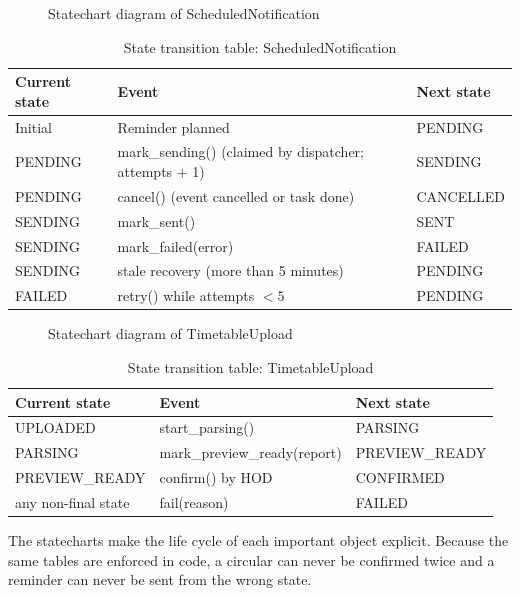 \begin{figure}[!htbp]
  \centering
  \resizebox{0.9\textwidth}{!}{\notificationstate}
  \caption{Statechart diagram of ScheduledNotification}
\end{figure}
\begin{xltabular}{\textwidth}{|p{3cm}|Y|p{3.2cm}|}
\caption{State transition table: ScheduledNotification}\\
\hline
\textbf{Current state} & \textbf{Event} & \textbf{Next state} \\ \hline
Initial & Reminder planned & PENDING \\ \hline
PENDING & mark\_sending() (claimed by dispatcher; attempts + 1) & SENDING \\ \hline
PENDING & cancel() (event cancelled or task done) & CANCELLED \\ \hline
SENDING & mark\_sent() & SENT \\ \hline
SENDING & mark\_failed(error) & FAILED \\ \hline
SENDING & stale recovery (more than 5 minutes) & PENDING \\ \hline
FAILED & retry() while attempts $< 5$ & PENDING \\ \hline
\end{xltabular}

\begin{figure}[!htbp]
  \centering
  \resizebox{\textwidth}{!}{\uploadstate}
  \caption{Statechart diagram of TimetableUpload}
\end{figure}
\begin{xltabular}{\textwidth}{|p{3.4cm}|Y|p{3.2cm}|}
\caption{State transition table: TimetableUpload}\\
\hline
\textbf{Current state} & \textbf{Event} & \textbf{Next state} \\ \hline
UPLOADED & start\_parsing() & PARSING \\ \hline
PARSING & mark\_preview\_ready(report) & PREVIEW\_READY \\ \hline
PREVIEW\_READY & confirm() by HOD & CONFIRMED \\ \hline
any non-final state & fail(reason) & FAILED \\ \hline
\end{xltabular}

The statecharts make the life cycle of each important object explicit. Because the same tables are enforced in code, a circular can never be confirmed twice and a reminder can never be sent from the wrong state.

